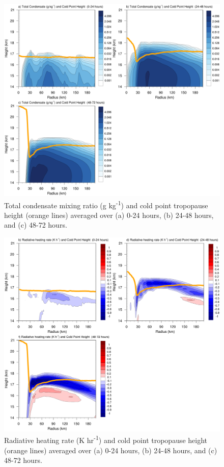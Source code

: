 \documentclass{ametsoc}
\begin{document}
\begin{figure}[ht]
\centerline{\includegraphics[width=39pc]{figures/qtot.png}}
\caption{Total condensate mixing ratio (g kg\textsuperscript{-1}) and cold point tropopause height (orange lines) averaged over (a) 0-24 hours, (b) 24-48 hours, and (c) 48-72 hours.}
\label{fig:qtot}
\end{figure}

\begin{figure}[ht]
\centerline{\includegraphics[width=39pc]{figures/radten.png}}
\caption{Radiative heating rate (K hr\textsuperscript{-1}) and cold point tropopause height (orange lines) averaged over (a) 0-24 hours, (b) 24-48 hours, and (c) 48-72 hours.}
\label{fig:radten}
\end{figure}
\end{document}
